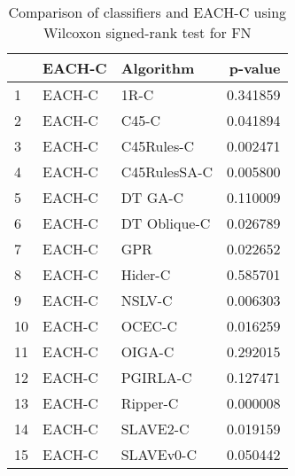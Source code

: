 \begin{table}
\footnotesize
\caption{Comparison of classifiers and EACH-C using Wilcoxon signed-rank test for FN}
\label{tab:EACH-C wilcoxon FN comparison}
\begin{tabular}{lllr}
\hline
 & EACH-C & Algorithm & p-value \\
\hline
1 & EACH-C & 1R-C & 0.341859 \\
2 & EACH-C & C45-C & 0.041894 \\
3 & EACH-C & C45Rules-C & 0.002471 \\
4 & EACH-C & C45RulesSA-C & 0.005800 \\
5 & EACH-C & DT GA-C & 0.110009 \\
6 & EACH-C & DT Oblique-C & 0.026789 \\
7 & EACH-C & GPR & 0.022652 \\
8 & EACH-C & Hider-C & 0.585701 \\
9 & EACH-C & NSLV-C & 0.006303 \\
10 & EACH-C & OCEC-C & 0.016259 \\
11 & EACH-C & OIGA-C & 0.292015 \\
12 & EACH-C & PGIRLA-C & 0.127471 \\
13 & EACH-C & Ripper-C & 0.000008 \\
14 & EACH-C & SLAVE2-C & 0.019159 \\
15 & EACH-C & SLAVEv0-C & 0.050442 \\
\hline
\end{tabular}
\end{table}
